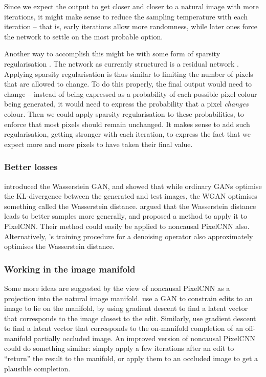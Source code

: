\documentclass[11pt, a4paper, openany]{book}
\newcommand{\nquote}[1]{``{#1}''}
\begin{document}
Since we expect the output to get closer and closer to a natural image with more iterations, it might make sense to reduce the sampling temperature with each iteration -- that is, early iterations allow more randomness, while later ones force the network to settle on the most probable option.

Another way to accomplish this might be with some form of sparsity regularisation \citep{sparse1,sparse2}. The network as currently structured is a residual network \citep{resnet}. Applying sparsity regularisation is thus similar to limiting the number of pixels that are allowed to change. To do this properly, the final output would need to change -- instead of being expressed as a probability of each possible pixel colour being generated, it would need to express the probability that a pixel \emph{changes} colour. Then we could apply sparsity regularisation to these probabilities, to enforce that most pixels should remain unchanged. It makes sense to add such regularisation, getting stronger with each iteration, to express the fact that we expect more and more pixels to have taken their final value.

\subsubsection{Better losses}

\citet{wgan} introduced the Wasserstein GAN, and showed that while ordinary GANs optimise the KL-divergence between the generated and test images, the WGAN optimises something called the Wasserstein distance. \citet{quantile} argued that the Wasserstein distance leads to better samples more generally, and proposed a method to apply it to PixelCNN. Their method could easily be applied to noncausal PixelCNN also. Alternatively, \citet{iterativeclosest}'s training procedure for a denoising operator also approximately optimises the Wasserstein distance.

\subsubsection{Working in the image manifold}

Some more ideas are suggested by the view of noncausal PixelCNN as a projection into the natural image manifold. \citet{manifoldmanipulation} use a GAN to constrain edits to an image to lie on the manifold, by using gradient descent to find a latent vector that corresponds to the image closest to the edit. Similarly, \citet{imageinpainting} use gradient descent to find a latent vector that corresponds to the on-manifold completion of an off-manifold partially occluded image. An improved version of noncausal PixelCNN could do something similar: simply apply a few iterations after an edit to \nquote{return} the result to the manifold, or apply them to an occluded image to get a plausible completion.
\end{document}
